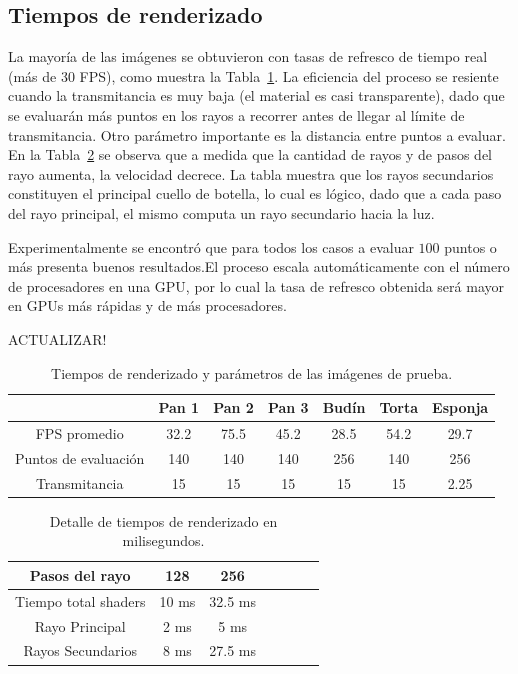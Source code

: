 \subsection{Tiempos de renderizado}

La mayoría de las imágenes se obtuvieron con tasas de refresco de tiempo real (más de 30 FPS), como muestra la Tabla~\ref{tab:n1}. La eficiencia del proceso se resiente cuando la transmitancia es muy baja (el material es casi transparente), dado que se evaluarán más puntos en los rayos a recorrer antes de llegar al límite de transmitancia. Otro parámetro importante es la distancia entre puntos a evaluar. En la Tabla~\ref{tab:n2} se observa que a medida que la cantidad de rayos y de pasos del rayo aumenta, la velocidad decrece. La tabla muestra que los rayos secundarios constituyen el principal cuello de botella, lo cual es lógico, dado que a cada paso del rayo principal, el mismo computa un rayo secundario hacia la luz.

Experimentalmente se encontró que para todos los casos a evaluar $100$ puntos o más presenta buenos resultados.El proceso escala automáticamente con el número de procesadores en una GPU, por lo cual la tasa de refresco obtenida será mayor en GPUs más rápidas y de más procesadores.


ACTUALIZAR!
\begin{table}[htb]
\centering
\begin{tabular}{|c|c|c|c|c|c|c|}
\hline &  Pan 1 & Pan 2 & Pan 3 & Budín & Torta & Esponja \\
\hline
\hline
 FPS promedio  & 32.2 &  75.5 &  45.2 & 28.5 &  54.2 & 29.7\\
\hline
 Puntos de evaluación &  140 &  140 &  140 & 256 &  140 & 256 \\
\hline
 Transmitancia &  15 &  15 &  15 & 15 &  15 & 2.25 \\
\hline
\end{tabular}
\caption{Tiempos de renderizado y parámetros de las imágenes de prueba.}
\label{tab:n1}
\end{table}

\begin{table}[htb]
\centering
\begin{tabular}{|c|c|c|c|c|c|c|}
\hline
 Pasos del rayo         & 128 &  256 \\
\hline
\hline
 Tiempo total shaders   & 10 ms &  32.5 ms \\
\hline
 Rayo Principal         & 2 ms  & 5 ms  \\
\hline
 Rayos Secundarios      &  8 ms & 27.5 ms  \\
\hline
\end{tabular}
\caption{Detalle de tiempos de renderizado en milisegundos.}
\label{tab:n2}
\end{table}


